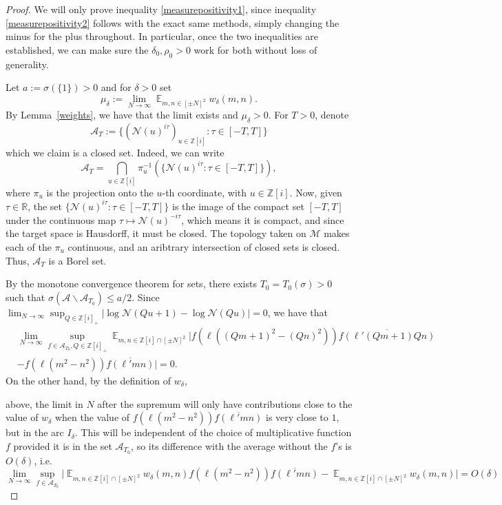 \documentclass[11pt]{amsart}
\theoremstyle{definition}
\DeclareMathOperator*{\E}{\mathbb{E}}
\newcommand{\NN}{{\mathcal N}}
\newcommand{\R}{{\mathbb R}}
\newcommand{\Z}{{\mathbb Z}}
\begin{document}
\begin{proof}
We will only prove inequality \eqref{measurepositivity1}, since inequality \eqref{measurepositivity2} follows with the exact same methods, simply changing the minus for the plus throughout. In particular, once the two inequalities are established, we can make sure the $\delta_0,\rho_0>0$ work for both without loss of generality.

Let $a:=\sigma(\{1\})>0$ and for $\delta>0$ set
    $$\mu_{\delta}:=\lim_{N\to\infty}\E_{m,n\in [\pm N]^{2}}w_{\delta}(m,n).$$
By Lemma~\ref{weights}, we have that the limit exists and $\mu_{\delta}>0$. For $T>0$, denote
$$\mathcal{A}_{T}:=\{(\NN(u)^{i\tau})_{u\in\Z[i]}\colon \tau\in [-T,T]\}$$
which we claim is a closed set. Indeed, we can write
\[
\mathcal{A}_T= \bigcap_{u \in \Z[i]} \pi_u^{-1}\left(\{ \NN(u)^{i\tau} : \tau \in [-T,T] \}\right),
\]
where $\pi_u$ is the projection onto the $u$-th coordinate, with $u \in \Z[i]$. Now, given $\tau \in \R$, the set $\{\NN(u)^{i\tau} : \tau \in [-T,T] \}$ is the image of the compact set $[-T,T]$ under the continuous map $\tau \mapsto\NN(u)^{-i\tau}$, which means it is compact, and since the target space is Hausdorff, it must be closed. The topology taken on $\mathcal{M}$ makes each of the $\pi_u$ continuous, and an aribtrary intersection of closed sets is closed. Thus, $\mathcal{A}_T$ is a Borel set.

By the monotone convergence theorem for sets, there exists $T_{0}=T_{0}(\sigma)>0$ such that $\sigma(\mathcal{A}\backslash\mathcal{A}_{T_{0}})\leq a/2$.
Since $\lim_{N\to\infty}\sup_{Q\in \Z[i]_{+}}\vert\log\NN(Qu+1)-\log\NN(Qu)\vert=0$,
we have that 
\begin{equation}
    \begin{split}
        &\lim_{N\to\infty}\sup_{f\in \mathcal{A}_{T_{0}},Q\in\Z[i]_{+}}\E_{m,n\in \Z[i]\cap [\pm N]^{2}}\vert f(\ell((Qm+1)^2-(Qn)^2))\overline{f(\ell'(Qm+1)Qn)}
        \\&-f(\ell(m^{2}-n^{2}))\overline{f(\ell'mn)}\vert=0.
    \end{split}
\end{equation}
On the other hand, by the definition of $w_{\delta}$, {\color{blue} above, the limit in $N$ after the supremum will only have contributions close to the value of $w_{\delta}$ when the value of $f(\ell(m^2-n^2))\overline{f(\ell'mn)}$ is very close to $1$, but in the arc $I_{\delta}$. This will be independent of the choice of multiplicative function $f$ provided it is in the set $\mathcal{A}_{T_0}$, so its difference with the average without the $f$'s is $O(\delta)$, i.e.
\[\lim_{N\to\infty}\sup_{f\in \mathcal{A}_{T_{0}}} \vert \E_{m,n\in \Z[i]\cap [\pm N]^{2}}w_{\delta}(m,n)f(\ell(m^{2}-n^{2}))\overline{f(\ell'mn)}-\E_{m,n\in \Z[i]\cap [\pm N]^{2}}w_{\delta}(m,n)\vert=O(\delta)\]

}
\end{proof}
\end{document}
